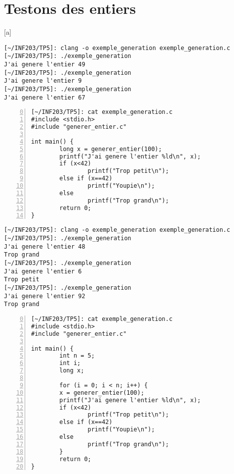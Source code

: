 \documentclass[12pt,a4paper,notitlepage,colorinlistoftodos]{article}
\begin{document}

\section{Testons des entiers}


[a] 
\begin{lstlisting}
[~/INF203/TP5]: clang -o exemple_generation exemple_generation.c
[~/INF203/TP5]: ./exemple_generation
J'ai genere l'entier 49
[~/INF203/TP5]: ./exemple_generation
J'ai genere l'entier 9
[~/INF203/TP5]: ./exemple_generation
J'ai genere l'entier 67
\end{lstlisting}


\begin{lstlisting}[numbers=left, firstnumber = 0 ]
[~/INF203/TP5]: cat exemple_generation.c
#include <stdio.h>
#include "generer_entier.c"

int main() {
        long x = generer_entier(100);
        printf("J'ai genere l'entier %ld\n", x);
        if (x<42)
                printf("Trop petit\n");
        else if (x==42)
                printf("Youpie\n");
        else 
                printf("Trop grand\n");
        return 0;
}
\end{lstlisting}

\begin{lstlisting}
[~/INF203/TP5]: clang -o exemple_generation exemple_generation.c
[~/INF203/TP5]: ./exemple_generation
J'ai genere l'entier 48
Trop grand
[~/INF203/TP5]: ./exemple_generation
J'ai genere l'entier 6
Trop petit
[~/INF203/TP5]: ./exemple_generation
J'ai genere l'entier 92
Trop grand
\end{lstlisting}


\begin{lstlisting}[numbers=left, firstnumber = 0 ]
[~/INF203/TP5]: cat exemple_generation.c
#include <stdio.h>
#include "generer_entier.c"

int main() {
        int n = 5;
        int i;
        long x;

        for (i = 0; i < n; i++) {
        x = generer_entier(100);
        printf("J'ai genere l'entier %ld\n", x);
        if (x<42)
                printf("Trop petit\n");
        else if (x==42)
                printf("Youpie\n");
        else 
                printf("Trop grand\n");
        }
        return 0;
}
\end{lstlisting}
\end{document}
